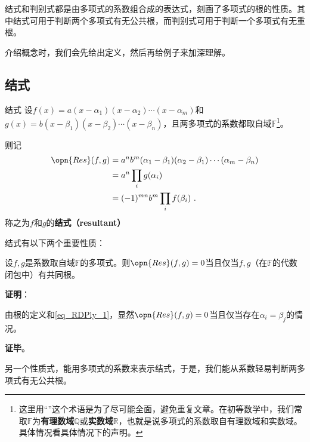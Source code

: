 

结式和判别式都是由多项式的系数组合成的表达式，刻画了多项式的根的性质。其中结式可用于判断两个多项式有无公共根，而判别式可用于判断一个多项式有无重根。

介绍概念时，我们会先给出定义，然后再给例子来加深理解。

\subsection{结式}

\begin{definition}{结式}
设$f(x)=a(x-\alpha_1)(x-\alpha_2)\cdots(x-\alpha_m)$和$g(x)=b(x-\beta_1)(x-\beta_2)\cdots(x-\beta_n)$，且两多项式的系数都取自域$\mathbb{F}$\footnote{这里用“”这个术语是为了尽可能全面，避免重复文章。在初等数学中，我们常取$\mathbb{F}$为\textbf{有理数域}$\mathbb{Q}$或\textbf{实数域}$\mathbb{R}$，也就是说多项式的系数取自有理数域和实数域。具体情况看具体情况下的声明。}。

则记
\begin{equation}\label{eq_RDPly_1}
\begin{aligned}
\opn{Res}(f, g)&=a^nb^m(\alpha_1-\beta_1)(\alpha_2-\beta_1)\cdots(\alpha_m-\beta_n)\\
&=a^n\prod_{i} g(\alpha_i)\\
&=(-1)^{mn}b^m\prod_{i} f(\beta_i)~.
\end{aligned}
\end{equation}
称之为$f$和$g$的\textbf{结式（resultant）}

\end{definition}

结式有以下两个重要性质：

\begin{theorem}{}
设$f, g$是系数取自域$\mathbb{F}$的多项式。则$\opn{Res}(f, g)=0$当且仅当$f, g$（在$\mathbb{F}$的代数闭包中）有共同根。
\end{theorem}

\textbf{证明}：

由根的定义和\autoref{eq_RDPly_1}，显然$\opn{Res}(f, g)=0$当且仅当存在$\alpha_i=\beta_j$的情况。

\textbf{证毕}。


另一个性质式，能用多项式的系数来表示结式，于是，我们能从系数轻易判断两多项式有无公共根。



